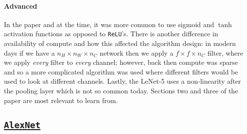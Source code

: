 \documentclass[12pt]{article}
\begin{document}
\paragraph{Advanced} In the paper and at the time, it was more common to use sigmoid and $\tanh$ activation functions as opposed to
\texttt{ReLU}'s. There is another difference in availability of compute and how this affected the algorithm design: in modern days
if we have a $n_H \times n_W \times n_C$ network then we apply a $f \times f \times n_C$ filter, where we apply \emph{every} 
filter to \emph{every} channel; however, back then compute was sparse and so a more complicated algorithm was used where different 
filters would be used to look at different channels. Lastly, the LeNet-5 uses a non-linearity after the pooling layer which is
not so common today. Sections two and three of the paper are most relevant to learn from.

\subsection{\href{https://papers.nips.cc/paper/4824-imagenet-classification-with-deep-convolutional-neural-networks.pdf}{\texttt{AlexNet}}}
\end{document}
